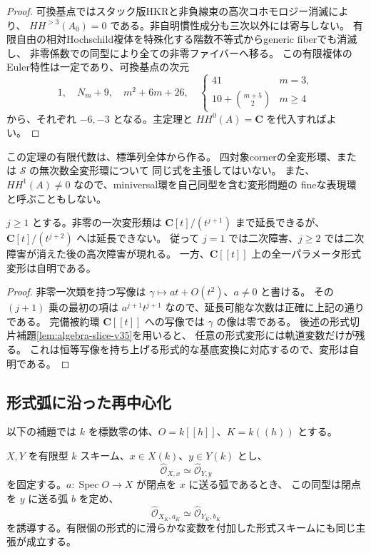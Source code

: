 \begin{proof}
可換基点ではスタック版HKRと非負線束の高次コホモロジー消滅により、
$HH^{>3}(A_0)=0$ である。非自明慣性成分も三次以外には寄与しない。
有限自由の相対Hochschild複体を特殊化する階数不等式からgeneric fiberでも消滅し、
非零係数での同型により全ての非零ファイバーへ移る。
この有限複体のEuler特性は一定であり、可換基点の次元
\[
 1,\quad N_m+9,\quad m^2+6m+26,\quad
 \begin{cases}41&m=3,\\10+\binom{m+5}{2}&m\ge4\end{cases}
\]
から、それぞれ $-6,-3$ となる。主定理と $HH^0(A)=\mathbf C$ を代入すればよい。
\end{proof}

この定理の有限代数は、標準列全体から作る。
四対象cornerの全変形環、または $\mathcal S$ の無次数全変形環について
同じ式を主張してはいない。
また、$HH^1(A)\ne0$ なので、miniversal環を自己同型を含む変形問題の
fineな表現環と呼ぶこともしない。

\begin{corollary}[任意次数で初めて現れる障害]
\label{cor:arbitrary-obstruction-v35}
$j\ge1$ とする。非零の一次変形類は
$\mathbf C[t]/(t^{j+1})$ まで延長できるが、
$\mathbf C[t]/(t^{j+2})$ へは延長できない。
従って $j=1$ では二次障害、$j\ge2$ では二次障害が消えた後の高次障害が現れる。
一方、$\mathbf C[[t]]$ 上の全一パラメータ形式変形は自明である。
\end{corollary}

\begin{proof}
非零一次類を持つ写像は $\gamma\mapsto at+O(t^2)$、$a\ne0$ と書ける。
その $(j+1)$ 乗の最初の項は $a^{j+1}t^{j+1}$ なので、延長可能な次数は正確に上記の通りである。
完備被約環 $\mathbf C[[t]]$ への写像では $\gamma$ の像は零である。
後述の形式切片補題\ref{lem:algebra-slice-v35}を用いると、
任意の形式変形には軌道変数だけが残る。
これは恒等写像を持ち上げる形式的な基底変換に対応するので、変形は自明である。
\end{proof}

\subsection{形式弧に沿った再中心化}

以下の補題では $k$ を標数零の体、$O=k[[h]]$、$K=k((h))$ とする。

\begin{lemma}[形式同型の弧に沿う移送]
\label{lem:arc-translation-v35}
$X,Y$ を有限型 $k$ スキーム、$x\in X(k)$、$y\in Y(k)$ とし、
\[
 \widehat{\mathcal O}_{X,x}\simeq\widehat{\mathcal O}_{Y,y}
\]
を固定する。$a\colon\operatorname{Spec}O\to X$ が閉点を $x$ に送る弧であるとき、
この同型は閉点を $y$ に送る弧 $b$ を定め、
\[
 \widehat{\mathcal O}_{X_K,a_K}\simeq
 \widehat{\mathcal O}_{Y_K,b_K}
\]
を誘導する。有限個の形式的に滑らかな変数を付加した形式スキームにも同じ主張が成立する。
\end{lemma}

